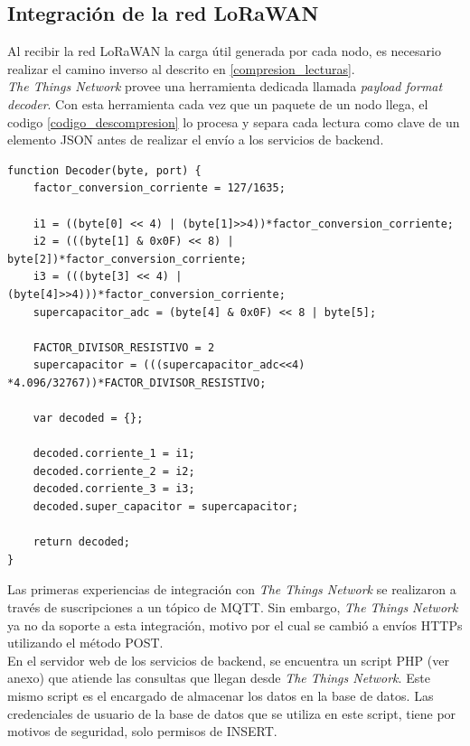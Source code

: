 \subsection{Integraci\'{o}n de la red LoRaWAN}
\label{seccion_lorawan}
Al recibir la red LoRaWAN la carga útil generada por cada nodo, es necesario realizar el camino inverso al descrito en \ref{compresion_lecturas}.\\
\textit{The Things Network} provee una herramienta dedicada llamada \textit{payload format decoder}. Con esta herramienta cada vez que un paquete de un nodo llega, el codigo \ref{codigo_descompresion} lo procesa y separa cada lectura como clave de un elemento JSON antes de realizar el env\'{i}o a los servicios de backend.\\
\begin{lstlisting}[label=codigo_descompresion,caption=Función encargada de descomprimir las 4 lecturas de 12 bits.]
function Decoder(byte, port) {
	factor_conversion_corriente = 127/1635;
	
	i1 = ((byte[0] << 4) | (byte[1]>>4))*factor_conversion_corriente;
	i2 = (((byte[1] & 0x0F) << 8) | byte[2])*factor_conversion_corriente;
	i3 = (((byte[3] << 4) | (byte[4]>>4)))*factor_conversion_corriente;
	supercapacitor_adc = (byte[4] & 0x0F) << 8 | byte[5];
	
	FACTOR_DIVISOR_RESISTIVO = 2
	supercapacitor = (((supercapacitor_adc<<4) *4.096/32767))*FACTOR_DIVISOR_RESISTIVO;	
	
	var decoded = {};

	decoded.corriente_1 = i1;
	decoded.corriente_2 = i2;
	decoded.corriente_3 = i3;
	decoded.super_capacitor = supercapacitor;

	return decoded;  
}   

\end{lstlisting}
Las primeras experiencias de integración con \textit{The Things Network} se realizaron a través de suscripciones a un tópico de MQTT. Sin embargo, \textit{The Things Network} ya no da soporte a esta integración, motivo por el cual se cambió a envíos HTTPs utilizando el método POST.\\
En el servidor web de los servicios de backend, se encuentra un script PHP (ver anexo) que atiende las consultas que llegan desde \textit{The Things Network}. Este mismo script es el encargado de almacenar los datos en la base de datos. Las credenciales de usuario de la base de datos que se utiliza en este script, tiene por motivos de seguridad, solo permisos de INSERT.\\

